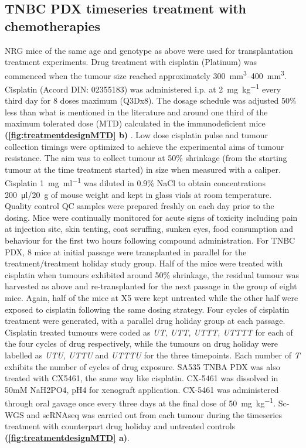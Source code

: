 \subsection{TNBC PDX timeseries treatment with chemotherapies}
\label{ssec:rx}
NRG mice of the same age and genotype as above were used for transplantation treatment experiments. Drug treatment with cisplatin (Platinum) was commenced when the tumour size reached approximately \SIrange{300}{400}{\mm\cubed}. Cisplatin (Accord DIN: 02355183)  was administered i.p. at \SI{2}{\mg\per\kg} every third day for 8 doses maximum (Q3Dx8). The dosage schedule was adjusted 50\% less than what is mentioned in the literature \cite{li2013enhanced,wang2013klotho} and around one third of the maximum tolerated dose (MTD) calculated in the immunodeficient mice  \textbf{(\autoref{fig:treatmentdesignMTD} b)} . Low dose cisplatin pulse and tumour collection timings were optimized to achieve the experimental aims of tumour resistance. The aim was to collect tumour at 50\% shrinkage (from the starting tumour at the time treatment started) in size when measured with a caliper. Cisplatin \SI{1}{\mg\per\ml} was diluted in 0.9\% NaCl to obtain concentrations \SI{200}{\ul}/\SI{20}{\g} of mouse weight and kept in glass vials at room temperature. Quality control \ac{QC} samples were prepared freshly on each day prior to the dosing. Mice were continually monitored for acute signs of toxicity including pain at injection site, skin tenting, coat scruffing, sunken eyes, food consumption and behaviour for the first two hours following compound administration. For TNBC PDX, 8 mice at initial passage were transplanted in parallel for the treatment/treatment holiday study group. Half of the mice were treated with cisplatin when tumours exhibited around 50\% shrinkage, the residual tumour was harvested as above and re-transplanted for the next passage in the group of eight mice. Again, half of the mice at X5 were kept untreated while the other half were exposed to cisplatin following the same dosing strategy. Four cycles of cisplatin treatment were generated, with a parallel drug holiday group at each passage. Cisplatin treated tumours were coded as \textit{UT, UTT, UTTT, UTTTT} for each of the four cycles of drug respectively, while the tumours on drug holiday were labelled as \textit{UTU, UTTU} and \textit{UTTTU} for the three timepoints. Each number of \textit{T} exhibits the number of cycles of drug exposure. SA535 TNBA PDX was also treated with CX5461, the same way like cisplatin. CX-5461 was dissolved in 50mM NaH2PO4, pH4 for xenograft application. CX-5461 was administered through oral gavage once every three days at the final dose of \SI{50}{\mg\per\kg}.
Sc-WGS and scRNAseq was carried out from each tumour during the timeseries treatment with counterpart drug holiday and untreated controls  \textbf{(\autoref{fig:treatmentdesignMTD} a)}.

